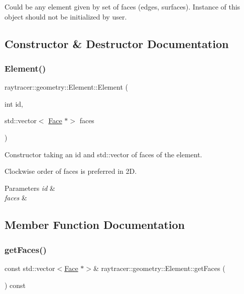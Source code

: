 Could be any element given by set of faces (edges, surfaces). Instance of this object should not be initialized by user. 

\subsection{Constructor \& Destructor Documentation}
\mbox{\label{classraytracer_1_1geometry_1_1Element_a689702f3ea97c81b216759a43cfa1ffe}} 
\subsubsection{\texorpdfstring{Element()}{Element()}}
{\footnotesize\ttfamily raytracer\+::geometry\+::\+Element\+::\+Element (\begin{DoxyParamCaption}\item[{int}]{id,  }\item[{std\+::vector$<$ \hyperlink{classraytracer_1_1geometry_1_1Face}{Face} $\ast$$>$}]{faces }\end{DoxyParamCaption})\hspace{0.3cm}{\ttfamily [explicit]}}



Constructor taking an id and std\+::vector of faces of the element. 

Clockwise order of faces is preferred in 2D. 
\begin{DoxyParams}{Parameters}
{\em id} & \\
\hline
{\em faces} & \\
\hline
\end{DoxyParams}


\subsection{Member Function Documentation}
\mbox{\label{classraytracer_1_1geometry_1_1Element_aed405192c2fa9b6488b2be4c78701062}} 
\subsubsection{\texorpdfstring{get\+Faces()}{getFaces()}}
{\footnotesize\ttfamily const std\+::vector$<$\hyperlink{classraytracer_1_1geometry_1_1Face}{Face} $\ast$$>$\& raytracer\+::geometry\+::\+Element\+::get\+Faces (\begin{DoxyParamCaption}{ }\end{DoxyParamCaption}) const}



